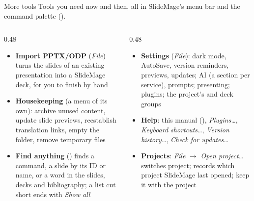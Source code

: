 
\begin{standardframe}{More tools}
	\small
	Tools you need now and then, all in SlideMage's \textcolor{c_primary_highlight}{menu bar} and the \textcolor{c_primary_highlight}{command palette} ().
	\par
	\begin{columns}[T,onlytextwidth]
		\begin{column}{0.48\linewidth}
			\begin{itemize}
				\item \textbf{Import PPTX/ODP} (\emph{File}) turns the slides of an existing presentation into a SlideMage deck, for you to finish by hand
				\item \textbf{Housekeeping} (a menu of its own): archive unused content, update slide previews, reestablish translation links, empty the  folder, remove temporary files
				\item \textbf{Find anything} () finds a command, a slide by its ID or name, or a word in the slides, decks and bibliography; a list cut short ends with \emph{Show all}
			\end{itemize}
		\end{column}
		\begin{column}{0.48\linewidth}
			\begin{itemize}
				\item \textbf{Settings} (\emph{File}): dark mode, AutoSave, version reminders, previews, updates; AI (a section per service), prompts; presenting; plugins; the project's  and deck groups
				\item \textbf{Help}: this manual (), \emph{Plugins\ldots}, \emph{Keyboard shortcuts\ldots}, \emph{Version history\ldots}, \emph{Check for updates\ldots}
				\item \textbf{Projects}: \emph{File} $\rightarrow$ \emph{Open project\ldots} switches project;  records which project SlideMage last opened; keep it with the project
			\end{itemize}
		\end{column}
	\end{columns}
\end{standardframe}
